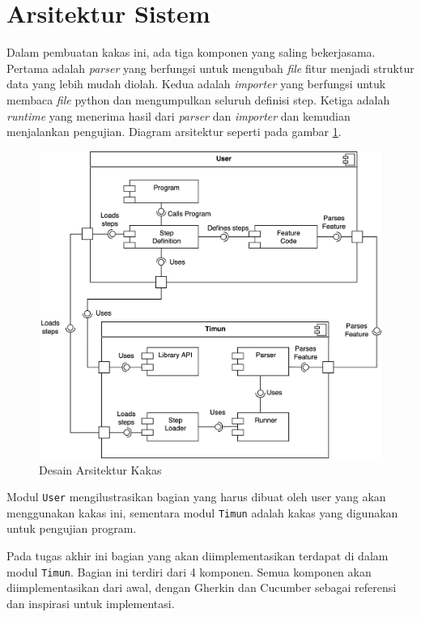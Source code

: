 \section{Arsitektur Sistem}

Dalam pembuatan kakas ini, ada tiga komponen yang saling bekerjasama. Pertama adalah \emph{parser} yang
berfungsi untuk mengubah \emph{file} fitur menjadi struktur data yang lebih mudah diolah. Kedua adalah
\emph{importer} yang berfungsi untuk membaca \emph{file} python dan mengumpulkan seluruh definisi step.
Ketiga adalah \emph{runtime} yang menerima hasil dari \emph{parser} dan \emph{importer} dan kemudian
menjalankan pengujian. Diagram arsitektur seperti pada gambar \ref{dia:desain-arsitektur}.

\begin{figure}[h]
  \centering
  \includegraphics[width=1\textwidth]{resources/component.png}
  \caption{Desain Arsitektur Kakas}
  \label{dia:desain-arsitektur}
\end{figure}

Modul \texttt{User} mengilustrasikan bagian yang harus dibuat oleh user yang akan menggunakan kakas ini,
sementara modul \texttt{Timun} adalah kakas yang digunakan untuk pengujian program.

Pada tugas akhir ini bagian yang akan diimplementasikan terdapat di dalam modul \texttt{Timun}.
Bagian ini terdiri dari 4 komponen. Semua komponen akan diimplementasikan dari awal,
dengan Gherkin dan Cucumber sebagai referensi dan inspirasi untuk implementasi.

